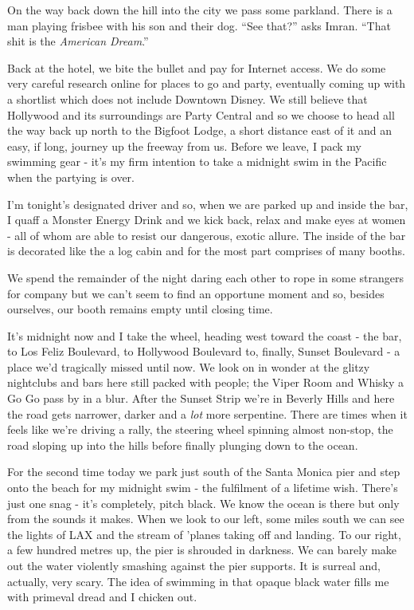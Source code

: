 \documentclass[a5paper,titlepage,11pt]{book}
\begin{document}
On the way back down the hill into the city we pass some parkland. There is a man playing frisbee with his son and their dog. ``See that?'' asks Imran. ``That shit is the \emph{American Dream}.''

Back at the hotel, we bite the bullet and pay for Internet access. We do some very careful research online for places to go and party, eventually coming up with a shortlist which does not include Downtown Disney. We still believe that Hollywood and its surroundings are Party Central and so we choose to head all the way back up north to the Bigfoot Lodge, a short distance east of it and an easy, if long, journey up the freeway from us. Before we leave, I pack my swimming gear - it's my firm intention to take a midnight swim in the Pacific when the partying is over.

I'm tonight's designated driver and so, when we are parked up and inside the bar, I quaff a Monster Energy Drink and we kick back, relax and make eyes at women - all of whom are able to resist our dangerous, exotic allure. The inside of the bar is decorated like the a log cabin and for the most part comprises of many booths.

We spend the remainder of the night daring each other to rope in some strangers for company but we can't seem to find an opportune moment and so, besides ourselves, our booth remains empty until closing time.

It's midnight now and I take the wheel, heading west toward the coast - the bar, to Los Feliz Boulevard, to Hollywood Boulevard to, finally, Sunset Boulevard - a place we'd tragically missed until now. We look on in wonder at the glitzy nightclubs and bars here still packed with people; the Viper Room and Whisky a Go Go pass by in a blur. After the Sunset Strip we're in Beverly Hills and here the road gets narrower, darker and a \emph{lot} more serpentine. There are times when it feels like we're driving a rally, the steering wheel spinning almost non-stop, the road sloping up into the hills before finally plunging down to the ocean.

For the second time today we park just south of the Santa Monica pier and step onto the beach for my midnight swim - the fulfilment of a lifetime wish. There's just one snag - it's completely, pitch black. We know the ocean is there but only from the sounds it makes. When we look to our left, some miles south we can see the lights of LAX and the stream of 'planes taking off and landing. To our right, a few hundred metres up, the pier is shrouded in darkness. We can barely make out the water violently smashing against the pier supports. It is surreal and, actually, very scary. The idea of swimming in that opaque black water fills me with primeval dread and I chicken out.
\end{document}
